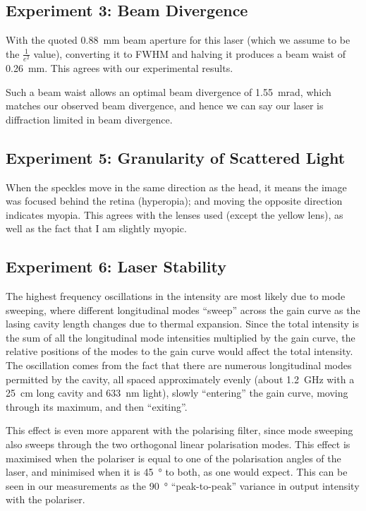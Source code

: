 \documentclass[a4paper]{scrartcl}
\begin{document}
\subsection{Experiment 3: Beam Divergence}
With the quoted \SI{0.88}{\milli\metre} beam aperture for this laser (which we assume to be the \(\frac{1}{e^2}\) value), converting it to FWHM and halving it produces a beam waist of \SI{0.26}{\milli\metre}. This agrees with our experimental results.

Such a beam waist allows an optimal beam divergence of \SI{1.55}{\milli\radian}, which matches our observed beam divergence, and hence we can say our laser is diffraction limited in beam divergence.

\subsection{Experiment 5: Granularity of Scattered Light}
When the speckles move in the same direction as the head, it means the image was focused behind the retina (hyperopia); and moving the opposite direction indicates myopia. This agrees with the lenses used (except the yellow lens), as well as the fact that I am slightly myopic.

\subsection{Experiment 6: Laser Stability}
The highest frequency oscillations in the intensity are most likely due to mode sweeping, where different longitudinal modes ``sweep'' across the gain curve as the lasing cavity length changes due to thermal expansion. Since the total intensity is the sum of all the longitudinal mode intensities multiplied by the gain curve, the relative positions of the modes to the gain curve would affect the total intensity. The oscillation comes from the fact that there are numerous longitudinal modes permitted by the cavity, all spaced approximately evenly (about \SI{1.2}{\giga\hertz} with a \SI{25}{\centi\metre} long cavity and \SI{633}{\nano\metre} light), slowly ``entering'' the gain curve, moving through its maximum, and then ``exiting''.

This effect is even more apparent with the polarising filter, since mode sweeping also sweeps through the two orthogonal linear polarisation modes. This effect is maximised when the polariser is equal to one of the polarisation angles of the laser, and minimised when it is \SI{45}{\degree} to both, as one would expect. This can be seen in our measurements as the \SI{90}{\degree} ``peak-to-peak'' variance in output intensity with the polariser.
\end{document}
